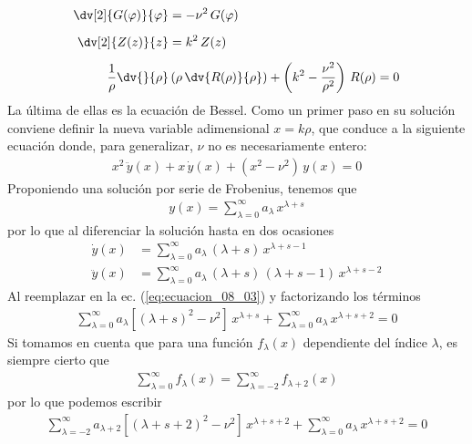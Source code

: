 \begin{align}
\begin{aligned}
\dv[2]{G(\varphi)}{\varphi} &= - \nu^{2} \, G(\varphi) \\[0.5em]
\dv[2]{Z(z)}{z} &= k^{2} \, Z(z) \\[0.5em]
\dfrac{1}{\rho} \dv{}{\rho} &\left( \rho \, \dv{R(\rho)}{\rho} \right) + \left( k^{2} - \dfrac{\nu^{2}}{\rho^{2}} \right) \, R(\rho) = 0
\end{aligned}
\label{eq:ecuacion_08_02} 
\end{align}
La última de ellas es la ecuación de Bessel. Como un primer paso en su solución conviene definir la nueva variable adimensional $ x = k \rho$, que conduce a la siguiente ecuación donde, para generalizar, $\nu$ no es necesariamente entero:
\begin{align}
x^{2} \, \ddot{y} (x) +  x \, \dot{y} (x) +  (x^{2} - \nu^{2}) \, y(x) = 0
\label{eq:ecuacion_08_03}
\end{align}
Proponiendo una solución por serie de Frobenius, tenemos que
\begin{align*}
y(x) = \sum_{\lambda=0}^{\infty} a_{\lambda} \, x^{\lambda + s}
\end{align*}
por lo que al diferenciar la solución hasta en dos ocasiones
\begin{align*}
\dot{y}(x) &= \sum_{\lambda=0}^{\infty} a_{\lambda} \, (\lambda + s) \, x^{\lambda + s - 1} \\
\ddot{y}(x) &= \sum_{\lambda=0}^{\infty} a_{\lambda} \, (\lambda + s) \, (\lambda + s - 1) \, x^{\lambda + s - 2}
\end{align*}
Al reemplazar en la ec. (\ref{eq:ecuacion_08_03}) y factorizando los términos
\begin{align*}
\sum_{\lambda=0}^{\infty} a_{\lambda} \left[ (\lambda + s)^{2} - \nu^{2} \right] \, x^{\lambda + s} + \sum_{\lambda=0}^{\infty} a_{\lambda} \, x^{\lambda + s + 2} = 0
\end{align*}
Si tomamos en cuenta que para una función $f_{\lambda} (x)$ dependiente del índice $\lambda$, es siempre cierto que
\begin{align*}
\sum_{\lambda=0}^{\infty} f_{\lambda} (x) = \sum_{\lambda=-2}^{\infty} f_{\lambda+2} (x)
\end{align*}
por lo que podemos escribir
\begin{align*}
\sum_{\lambda=-2}^{\infty} a_{\lambda+2} \left[ (\lambda + s + 2)^{2} - \nu^{2} \right] \, x^{\lambda + s + 2} + \sum_{\lambda=0}^{\infty} a_{\lambda} \, x^{\lambda + s + 2} = 0
\end{align*}
